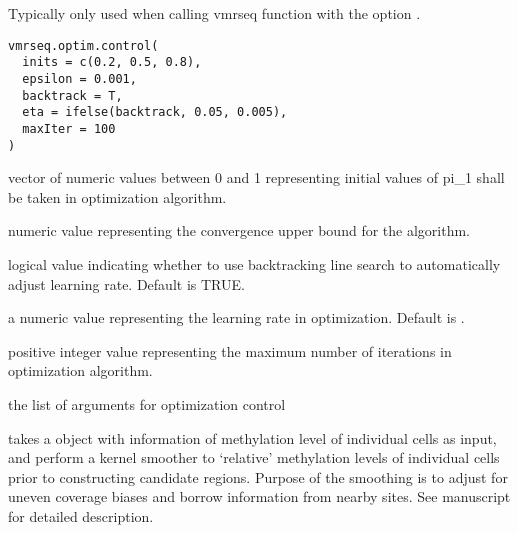 \documentclass[letterpaper]{book}
\begin{document}
%
\begin{Description}
Typically only used when calling vmrseq function with the
option .
\end{Description}
%
\begin{Usage}
\begin{verbatim}
vmrseq.optim.control(
  inits = c(0.2, 0.5, 0.8),
  epsilon = 0.001,
  backtrack = T,
  eta = ifelse(backtrack, 0.05, 0.005),
  maxIter = 100
)
\end{verbatim}
\end{Usage}
%
\begin{Arguments}
\begin{ldescription}
\item[\code{inits}] vector of numeric values between 0 and 1 representing initial
values of pi\_1 shall be taken in optimization algorithm.

\item[\code{epsilon}] numeric value representing the convergence upper bound for
the algorithm.

\item[\code{backtrack}] logical value indicating whether to use backtracking line
search to automatically adjust learning rate. Default is TRUE.

\item[\code{eta}] a numeric value representing the learning rate in optimization.
Default is .

\item[\code{maxIter}] positive integer value representing the maximum number of
iterations in optimization algorithm.
\end{ldescription}
\end{Arguments}
%
\begin{Value}
the list of arguments for optimization control
\end{Value}
%
\begin{Description}
 takes a  object
with information of methylation level of individual cells as input, and
perform a kernel smoother to ‘relative’ methylation levels of individual
cells prior to constructing candidate regions. Purpose of the smoothing is
to adjust for uneven coverage biases and borrow information from nearby sites.
See manuscript for detailed description.
\end{Description}
\end{document}
